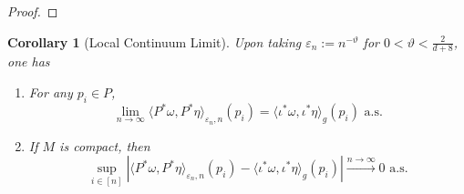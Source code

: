 \documentclass{article}
\let\todo\undefined
\let\todo\undefined
\newcommand{\todo}[1][]{}
\newtheorem{corollary}[theorem]{Corollary}
\theoremstyle{remark}
\theoremstyle{plain}
\begin{document}
\begin{proof}


\end{proof}

\begin{corollary}[Local Continuum Limit]
\label{cor:local-continuum-limit}
Upon taking \( \varepsilon_{n}:=n^{-\vartheta} \) for \( 0<\vartheta < \frac{2}{d+8} \), one has 
\begin{enumerate}
    \item[1. (Pointwise)] %
    For any \( p_{i}  \in P\), $$\lim_{n \to \infty} \langle P^{*}\omega, P^{*} \eta \rangle_{\varepsilon_{n}, n} (p_{i})=\langle \iota^{*}\omega, \iota^{*}\eta \rangle_{g}(p_{i}) \text{ a.s.}$$

   
    \item[2. (Uniform)] \label{item:local-continuum-limit-item-2}%
    If \( M \) is \emph{compact}, then \[ \sup_{i \in [n]}|\langle P^{*}\omega, P^{*}\eta \rangle_{\varepsilon_{n}, n}(p_{i})-\langle \iota^{*}\omega, \iota^{*}\eta \rangle_{g}(p_{i})| \xrightarrow{n\to \infty}0 \text{ a.s.} \] 
    
\end{enumerate}
    
\end{corollary}
\end{document}
